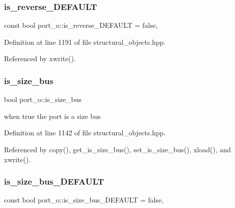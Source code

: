 \subsubsection{\texorpdfstring{is\+\_\+reverse\+\_\+\+D\+E\+F\+A\+U\+LT}{is\_reverse\_DEFAULT}}
{\footnotesize\ttfamily const bool port\+\_\+o\+::is\+\_\+reverse\+\_\+\+D\+E\+F\+A\+U\+LT = false\hspace{0.3cm}{\ttfamily [static]}, {\ttfamily [private]}}



Definition at line 1191 of file structural\+\_\+objects.\+hpp.



Referenced by xwrite().

\mbox{\label{structport__o_a1846a14b34889a279fcda8e1cad5ee78}} 
\subsubsection{\texorpdfstring{is\+\_\+size\+\_\+bus}{is\_size\_bus}}
{\footnotesize\ttfamily bool port\+\_\+o\+::is\+\_\+size\+\_\+bus\hspace{0.3cm}{\ttfamily [private]}}



when true the port is a size bus 



Definition at line 1142 of file structural\+\_\+objects.\+hpp.



Referenced by copy(), get\+\_\+is\+\_\+size\+\_\+bus(), set\+\_\+is\+\_\+size\+\_\+bus(), xload(), and xwrite().

\mbox{\label{structport__o_a4dd8048a6101091e8fd583e5e901a24f}} 
\subsubsection{\texorpdfstring{is\+\_\+size\+\_\+bus\+\_\+\+D\+E\+F\+A\+U\+LT}{is\_size\_bus\_DEFAULT}}
{\footnotesize\ttfamily const bool port\+\_\+o\+::is\+\_\+size\+\_\+bus\+\_\+\+D\+E\+F\+A\+U\+LT = false\hspace{0.3cm}{\ttfamily [static]}, {\ttfamily [private]}}



